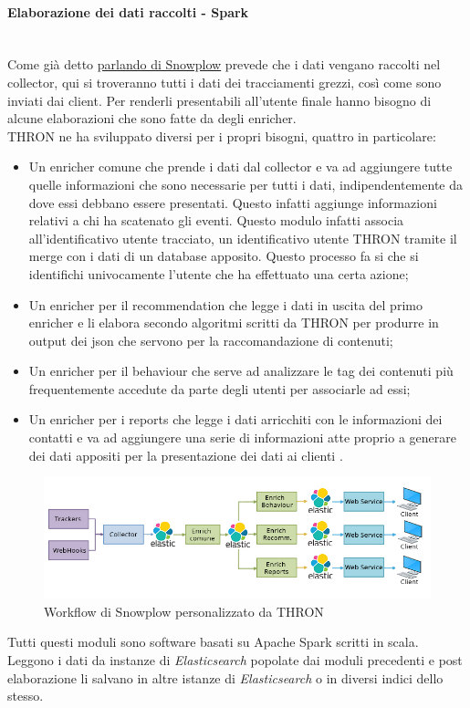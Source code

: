 \documentclass[a4paper, 12pt, twoside, openright]{book}
\begin{document}
\paragraph{Elaborazione dei dati raccolti - Spark}\mbox{} \\
Come già detto \hyperref[snowplow]{parlando di Snowplow} prevede che i dati vengano raccolti nel collector, qui si troveranno tutti i dati dei tracciamenti grezzi, così come sono inviati dai client. Per renderli presentabili all'utente finale hanno bisogno di alcune elaborazioni che sono fatte da degli enricher.\\
THRON ne ha sviluppato diversi per i propri bisogni, quattro in particolare:
\begin{itemize}
	\item Un enricher comune che prende i dati dal collector e va ad aggiungere tutte quelle informazioni che sono necessarie per tutti i dati, indipendentemente da dove essi debbano essere presentati. Questo infatti aggiunge informazioni relativi a chi ha scatenato gli eventi. Questo modulo infatti associa all'identificativo utente tracciato, un identificativo utente THRON tramite il merge con i dati di un database apposito. Questo processo fa si che si identifichi univocamente l'utente che ha effettuato una certa azione;
	\item Un enricher per il recommendation che legge i dati in uscita del primo enricher e li elabora secondo algoritmi scritti da THRON per produrre in output dei json che servono per la raccomandazione di contenuti;
	\item Un enricher per il behaviour che serve ad analizzare le tag dei contenuti più frequentemente accedute da parte degli utenti per associarle ad essi;
	\item Un enricher per i reports che legge i dati arricchiti con le informazioni dei contatti e va ad aggiungere una serie di informazioni atte proprio a generare dei dati appositi per la presentazione dei dati ai clienti .
\end{itemize}
\begin{figure}[H]
	\centering
	\label{snowplow-workflow-thron}	\includegraphics[width=1.0\textwidth]{images/snowplow-workflow-thron.jpg}
	\caption{Workflow di Snowplow personalizzato da THRON}
\end{figure} 
Tutti questi moduli sono software basati su Apache Spark scritti in scala. Leggono i dati da instanze di \textit{Elasticsearch} popolate dai moduli precedenti e post elaborazione li salvano in altre istanze di \textit{Elasticsearch} o in diversi indici dello stesso.\\
\end{document}
